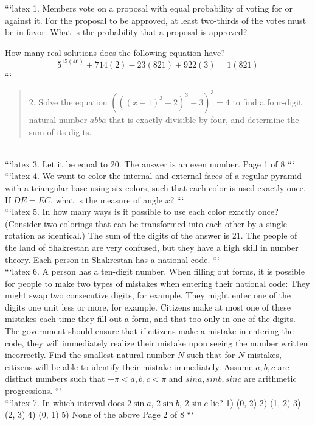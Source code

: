 ```latex
1. Members vote on a proposal with equal probability of voting for or against it. For the proposal to be approved, at least two-thirds of the votes must be in favor. What is the probability that a proposal is approved? 

How many real solutions does the following equation have? 
$$5^{15(46)} + 714(2) - 23(821) + 922(3) = 1(821)$$
```
\\
\begin{quote}
2. Solve the equation $(((x-1)^3-2)^3-3)^3=4$ to find a four-digit natural number $abba$ that is exactly divisible by four, and determine the sum of its digits.
\end{quote}
\\
```latex
3. 
Let it be equal to 20. 
The answer is an even number. 
Page 1 of 8
```
\\
```latex
4. We want to color the internal and external faces of a regular pyramid with a triangular base using six colors, such that each color is used exactly once. If $DE = EC$, what is the measure of angle $x$?
```
\\
```latex
5. In how many ways is it possible to use each color exactly once? (Consider two colorings that can be transformed into each other by a single rotation as identical.) The sum of the digits of the answer is 21. The people of the land of Shakrestan are very confused, but they have a high skill in number theory. Each person in Shakrestan has a national code.
```
\\
```latex
6. A person has a ten-digit number. When filling out forms, it is possible for people to make two types of mistakes when entering their national code: 
They might swap two consecutive digits, for example. 
They might enter one of the digits one unit less or more, for example. 
Citizens make at most one of these mistakes each time they fill out a form, and that too only in one of the digits. The government should ensure that if citizens make a mistake in entering the code, they will immediately realize their mistake upon seeing the number written incorrectly. Find the smallest natural number $N$ such that for $N$ mistakes, citizens will be able to identify their mistake immediately. 
Assume $a, b, c$ are distinct numbers such that $-\pi < a, b, c < \pi$ and $sina, sinb, sinc$ are arithmetic progressions.
```
\\
```latex
7. In which interval does $2 \sin a$, $2 \sin b$, $2 \sin c$ lie? 
1) (0, 2) 
2) (1, 2) 
3) (2, 3) 
4) (0, 1) 
5) None of the above
Page 2 of 8
```
\\
